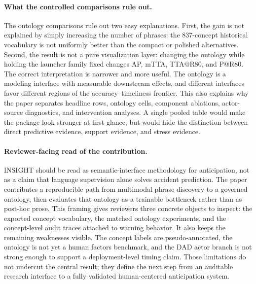 \documentclass[11pt]{article}
\newcommand{\method}{\textsc{INSIGHT}}
\begin{document}
\paragraph{What the controlled comparisons rule out.}
The ontology comparisons rule out two easy explanations. First, the gain is not
explained by simply increasing the number of phrases: the 837-concept historical
vocabulary is not uniformly better than the compact or polished alternatives.
Second, the result is not a pure visualization layer: changing the ontology
while holding the launcher family fixed changes AP, mTTA, TTA@R80, and P@R80.
The correct interpretation is narrower and more useful. The ontology is a
modeling interface with measurable downstream effects, and different
interfaces favor different regions of the accuracy--timeliness frontier. This
also explains why the paper separates headline rows, ontology cells,
component ablations, actor-source diagnostics, and intervention analyses. A
single pooled table would make the package look stronger at first glance, but
would hide the distinction between direct predictive evidence, support
evidence, and stress evidence.

\paragraph{Reviewer-facing read of the contribution.}
\method{} should be read as semantic-interface methodology for anticipation,
not as a claim that language supervision alone solves accident prediction. The
paper contributes a reproducible path from multimodal phrase discovery to a
governed ontology, then evaluates that ontology as a trainable bottleneck
rather than as post-hoc prose. This framing gives reviewers three concrete
objects to inspect: the exported concept vocabulary, the matched ontology
experiments, and the concept-level audit traces attached to warning behavior.
It also keeps the remaining weaknesses visible. The concept labels are
pseudo-annotated, the ontology is not yet a human factors benchmark, and the
DAD actor branch is not strong enough to support a deployment-level timing
claim. Those limitations do not undercut the central result; they define the
next step from an auditable research interface to a fully validated
human-centered anticipation system.
\end{document}

